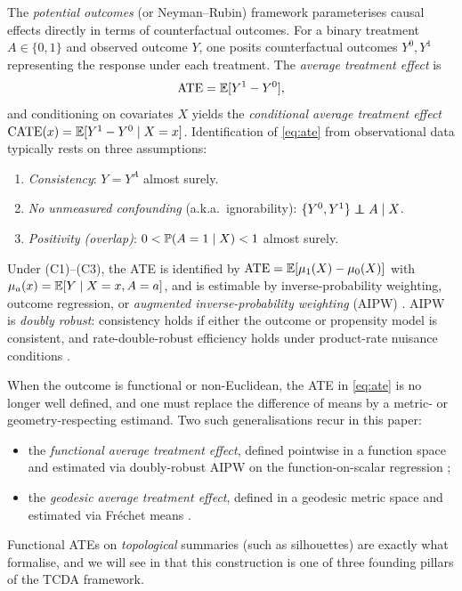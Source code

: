 The \emph{potential outcomes} (or Neyman--Rubin) framework
\citep{rubin1974estimating,rubin2005causal,imbens2015causal} parameterises
causal effects directly in terms of counterfactual outcomes. For a binary
treatment $A \in \{0,1\}$ and observed outcome $Y$, one posits
counterfactual outcomes $Y^0, Y^1$ representing the response under each
treatment. The \emph{average treatment effect} is
\begin{equation}
  \operatorname{ATE} = \mathbb{E}[Y^1 - Y^0],
  \label{eq:ate}
\end{equation}
and conditioning on covariates $X$ yields the \emph{conditional average
treatment effect} $\operatorname{CATE}(x) = \mathbb{E}[Y^1 - Y^0 \mid X = x]$. Identification of
\cref{eq:ate} from observational data typically rests on three
assumptions:
\begin{enumerate}[label=(C\arabic*), leftmargin=*]
  \item \emph{Consistency}: $Y = Y^A$ almost surely.
  \item \emph{No unmeasured confounding} (a.k.a.\ ignorability):
        $\{Y^0, Y^1\} \perp\!\!\!\!\perp A \mid X$.
  \item \emph{Positivity (overlap)}: $0 < \mathbb{P}(A = 1 \mid X) < 1$ almost surely.
\end{enumerate}
Under (C1)--(C3), the ATE is identified by
$\operatorname{ATE} = \mathbb{E}[\mu_1(X) - \mu_0(X)]$ with $\mu_a(x) = \mathbb{E}[Y \mid X = x, A = a]$,
and is estimable by inverse-probability weighting, outcome regression, or
\emph{augmented inverse-probability weighting} (AIPW)
\citep{kennedy2024semiparametric,chernozhukov2018double}. AIPW is
\emph{doubly robust}: consistency holds if either the outcome or
propensity model is consistent, and rate-double-robust efficiency holds
under product-rate nuisance conditions
\citep{kennedy2023towards,newey2018cross}.

When the outcome is functional or non-Euclidean, the ATE in \cref{eq:ate}
is no longer well defined, and one must replace the difference of means by
a metric- or geometry-respecting estimand. Two such generalisations recur
in this paper:
\begin{itemize}[leftmargin=*]
  \item the \emph{functional average treatment effect}, defined
        pointwise in a function space and estimated via doubly-robust
        AIPW on the function-on-scalar regression
        \citep{ecker2024causal,testa2025doubly,liebl2023fast};
  \item the \emph{geodesic average treatment effect}, defined in a
        geodesic metric space and estimated via Fréchet means
        \citep{kurisu2024geodesic}.
\end{itemize}
Functional ATEs on \emph{topological} summaries (such as silhouettes) are
exactly what \citet{kim2026topological} formalise, and we will see in
 that this construction is one of three founding
pillars of the TCDA framework.

